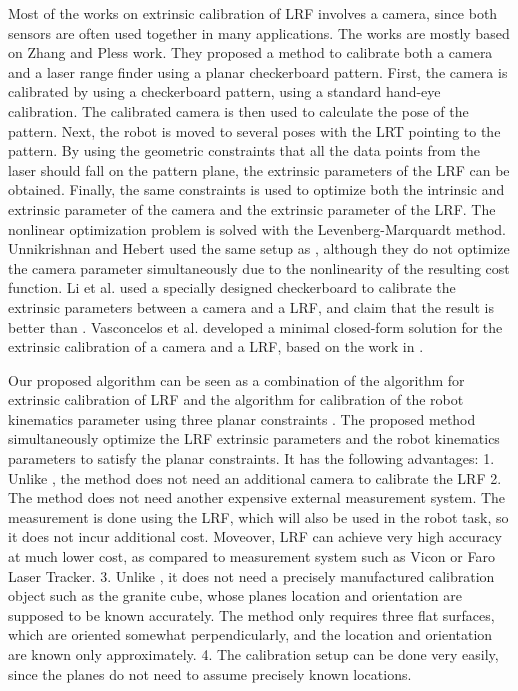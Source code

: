 Most of the works on extrinsic calibration of LRF involves a camera, since both sensors are often used together in many applications. The works are mostly based on Zhang and Pless work\cite{QilongZhang2015}. They proposed a method to calibrate both a camera and a laser range finder using a planar checkerboard pattern. First, the camera is calibrated by using a checkerboard pattern, using a standard hand-eye calibration. The calibrated camera is then used to calculate the pose of the pattern. Next, the robot is moved to several poses with the LRT pointing to the pattern. By using the geometric constraints that all the data points from the laser should fall on the pattern plane, the extrinsic parameters of the LRF can be obtained. Finally, the same constraints is used to optimize both the intrinsic and extrinsic parameter of the camera and the extrinsic parameter of the LRF. The nonlinear optimization problem is solved with the Levenberg-Marquardt method.
Unnikrishnan and Hebert \cite{Unnikrishnan2005} used the same setup as \cite{QilongZhang2015}, although they do not optimize the camera parameter simultaneously due to the nonlinearity of the resulting cost function. 
Li et al. \cite{Li2007} used a specially designed checkerboard to calibrate the extrinsic parameters between a camera and a LRF, and claim that the result is better than \cite{QilongZhang2015}. Vasconcelos et al. \cite{Vasconcelos2012} developed a minimal closed-form solution for the extrinsic calibration of a camera and a LRF, based on the work in \cite{QilongZhang2015}. 

Our proposed algorithm can be seen as a combination of the algorithm for extrinsic calibration of LRF \cite{QilongZhang2015} and the algorithm for calibration of the robot kinematics parameter using three planar constraints \cite{Zhuang1999}. The proposed method simultaneously optimize the LRF extrinsic parameters and the robot kinematics parameters to satisfy the planar constraints. It has the following advantages:
1. Unlike \cite{QilongZhang2015}, the method does not need an additional camera to calibrate the LRF
2. The method does not need another expensive external measurement system. The measurement is done using the LRF, which will also be used in the robot task, so it does not incur additional cost. Moveover, LRF can achieve very high accuracy at much lower cost, as compared to measurement system such as Vicon or Faro Laser Tracker. 
3. Unlike \cite{Zhuang1999}, it does not need a precisely manufactured calibration object such as the granite cube, whose planes location and orientation are supposed to be known accurately. The method only requires
three flat surfaces, which are oriented somewhat perpendicularly, and the location and orientation are known only approximately. 
4. The calibration setup can be done very easily, since the planes do not need to assume precisely known locations.  



